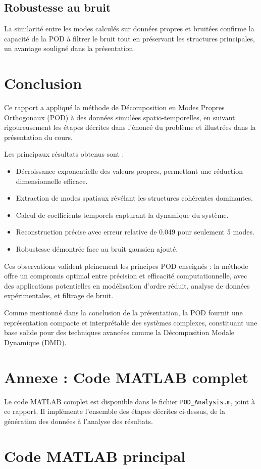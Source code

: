 \documentclass{rapportECL}
\begin{document}
\subsection{Robustesse au bruit}
La similarité entre les modes calculés sur données propres et bruitées confirme la capacité de la POD à filtrer le bruit tout en préservant les structures principales, un avantage souligné dans la présentation.

\section{Conclusion}

Ce rapport a appliqué la méthode de Décomposition en Modes Propres Orthogonaux (POD) à des données simulées spatio-temporelles, en suivant rigoureusement les étapes décrites dans l'énoncé du problème et illustrées dans la présentation du cours.

Les principaux résultats obtenus sont :
\begin{itemize}
    \item Décroissance exponentielle des valeurs propres, permettant une réduction dimensionnelle efficace.
    \item Extraction de modes spatiaux révélant les structures cohérentes dominantes.
    \item Calcul de coefficients temporels capturant la dynamique du système.
    \item Reconstruction précise avec erreur relative de 0.049 pour seulement 5 modes.
    \item Robustesse démontrée face au bruit gaussien ajouté.
\end{itemize}

Ces observations valident pleinement les principes POD enseignés : la méthode offre un compromis optimal entre précision et efficacité computationnelle, avec des applications potentielles en modélisation d'ordre réduit, analyse de données expérimentales, et filtrage de bruit.

Comme mentionné dans la conclusion de la présentation, la POD fournit une représentation compacte et interprétable des systèmes complexes, constituant une base solide pour des techniques avancées comme la Décomposition Modale Dynamique (DMD).

\section*{Annexe : Code MATLAB complet}
Le code MATLAB complet est disponible dans le fichier \texttt{POD\_Analysis.m}, joint à ce rapport. Il implémente l'ensemble des étapes décrites ci-dessus, de la génération des données à l'analyse des résultats.

\appendix
\section{Code MATLAB principal}

\end{document}
